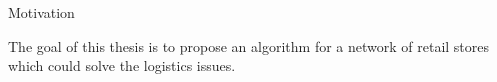 \vfill
\eject

\chap Motivation

The goal of this thesis is to propose an algorithm for a network of retail stores which could solve the logistics
issues. 

